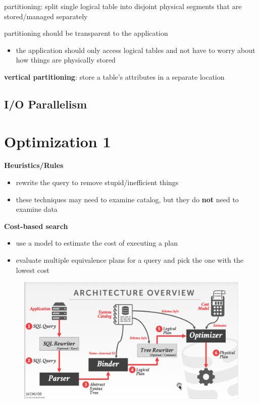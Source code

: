 \documentclass[11pt]{article}
\begin{document}
partitioning: split single logical table into disjoint physical segments that are stored/managed
separately

partitioning should be transparent to the application
\begin{itemize}
\item the application should only access logical tables and not have to worry about how things are
physically stored
\end{itemize}

\textbf{vertical partitioning}: store a table's attributes in a separate location


\subsection{I/O Parallelism}
\label{sec:org46b8b0c}
\section{Optimization 1}
\label{sec:org6984d76}
\textbf{Heuristics/Rules}
\begin{itemize}
\item rewrite the query to remove stupid/inefficient things
\item these techniques may need to examine catalog, but they do \textbf{not} need to examine data
\end{itemize}

\textbf{Cost-based search}
\begin{itemize}
\item use a model to estimate the cost of executing a plan
\item evaluate multiple equivalence plans for a query and pick the one with the lowest cost
\end{itemize}

\begin{figure}[htbp]
\centering
\includegraphics[width=.7\textwidth]{../images/15445/37.png}
\label{}
\end{figure}
\end{document}

